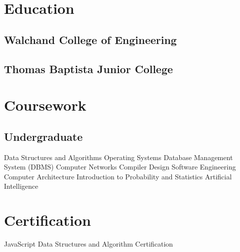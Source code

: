 \documentclass[]{resume}
\begin{document}
\begin{minipage}[t]{0.33\textwidth}


\section{Education}

\subsection{Walchand College of Engineering}
\sectionsep

\subsection{Thomas Baptista Junior College}
\sectionsep


\section{Coursework}

\subsection{Undergraduate}
    Data Structures and Algorithms \textbullet{} Operating Systems \textbullet{} Database Management System (DBMS) \textbullet{} Computer Networks \textbullet{} Compiler Design \textbullet{} Software Engineering  \textbullet{} Computer Architecture \textbullet{} Introduction to Probability and Statistics \textbullet{} Artificial Intelligence
\sectionsep


\section{Certification}
    {\small JavaScript Data Structures and Algorithm Certification\href{https://www.freecodecamp.org/certification/Daivik_L_K/javascript-algorithms-and-data-structures}{\faLink}}
\sectionsep


\end{minipage}
\end{document}
